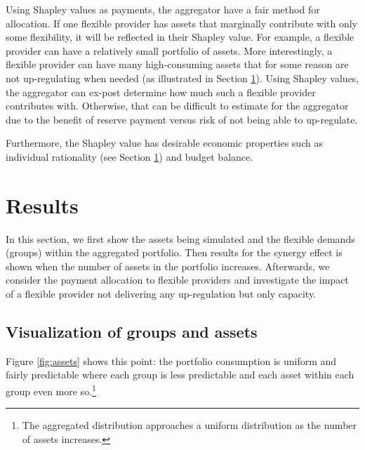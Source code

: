 \documentclass[lettersize,journal]{IEEEtran}
\begin{document}
Using Shapley values as payments, the aggregator have a fair method for allocation. If one flexible provider has assets that marginally contribute with only some flexibility, it will be reflected in their Shapley value. For example, a flexible provider can have a relatively small portfolio of assets. More interestingly, a flexible provider can have many high-consuming assets that for some reason are not up-regulating when needed (as illustrated in Section \ref{sec:Results}). Using Shapley values, the aggregator can ex-post determine how much such a flexible provider contributes with. Otherwise, that can be difficult to estimate for the aggregator due to the benefit of reserve payment versus risk of not being able to up-regulate.

Furthermore, the Shapley value has desirable economic properties such as individual rationality (see Section \ref{sec:Results}) and budget balance.

\section{Results}\label{sec:Results}

In this section, we first show the assets being simulated and the flexible demands (groups) within the aggregated portfolio. Then results for the synergy effect is shown when the number of assets in the portfolio increases. Afterwards, we consider the payment allocation to flexible providers and investigate the impact of a flexible provider not delivering any up-regulation but only capacity.

\subsection{Visualization of groups and assets}

Figure \ref{fig:assets} shows this point: the portfolio consumption is uniform and fairly predictable where each group is less predictable and each asset within each group even more so.\footnote{The aggregated distribution approaches a uniform distribution as the number of assets increases.}
\end{document}
